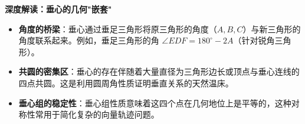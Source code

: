 \begin{explanationbox}
\textbf{深度解读：垂心的几何"嵌套"}
\begin{itemize}
    \item \textbf{角度的桥梁}：垂心通过垂足三角形将原三角形的角度（$A, B, C$）与新三角形的角度联系起来。例如，垂足三角形的角 $\angle EDF = 180^\circ - 2A$（针对锐角三角形）。
    \item \textbf{共圆的密集区}：垂心的存在伴随着大量直径为三角形边长或顶点与垂心连线的四点共圆。这是利用圆周角性质证明垂直关系的天然温床。
    \item \textbf{垂心组的稳定性}：垂心组性质意味着这四个点在几何地位上是平等的，这种对称性常用于简化复杂的向量轨迹问题。
\end{itemize}
\end{explanationbox}